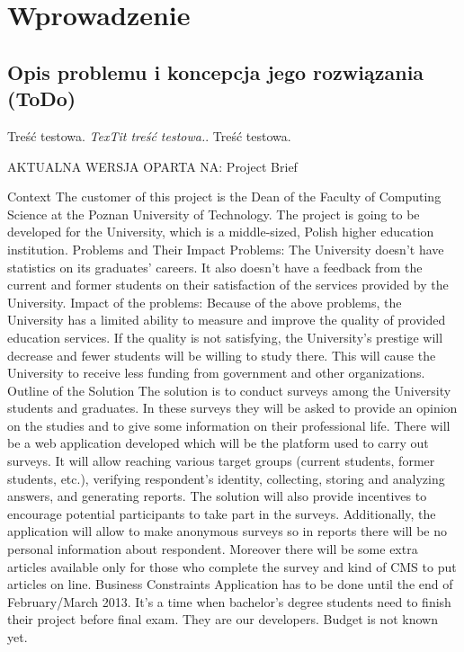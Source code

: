 \chapter{Wprowadzenie}
\label{Chapter1}

\section{Opis problemu i koncepcja jego rozwiązania (ToDo)}
\label{Chapter11}

Treść testowa. \textit{TexTit treść testowa.}. Treść testowa.

AKTUALNA WERSJA OPARTA NA: Project Brief

Context
The customer of this project is the Dean of the Faculty of Computing Science at the Poznan University of Technology. The project is going to be developed for the University, which is a middle-sized, Polish higher education institution. 
Problems and Their Impact
Problems:
The University doesn't have statistics on its graduates' careers. It also doesn't have a feedback from the current and former students on their satisfaction of the services provided by the University.
Impact of the problems:
Because of the above problems, the University has a limited ability to measure and improve the quality of provided education services. If the quality is not satisfying, the University's prestige will decrease and fewer students will be willing to study there. This will cause the University to receive less funding from government and other organizations. 
Outline of the Solution
The solution is to conduct surveys among the University students and graduates. In these surveys they will be asked to provide an opinion on the studies and to give some information on their professional life.
There will be a web application developed which will be the platform used to carry out surveys. It will allow reaching various target groups (current students, former students, etc.), verifying respondent's identity, collecting, storing and analyzing answers, and generating reports. The solution will also provide incentives to encourage potential participants to take part in the surveys. 
Additionally, the application will allow to make anonymous surveys so in reports there will be no personal information about respondent. Moreover there will be some extra articles available only for those who complete the survey and kind of CMS to put articles on line. 
Business Constraints
Application has to be done until the end of February/March 2013. It’s a time when bachelor’s degree students need to finish their project before final exam. They are our developers. Budget is not known yet. 
